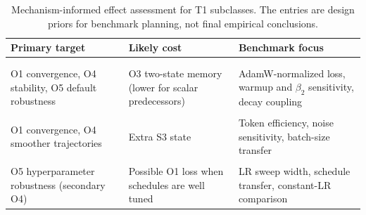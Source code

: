 \begin{table}[!htbp]
  \centering
  \caption{Mechanism-informed effect assessment for T1 subclasses. The entries are design priors for benchmark planning, not final empirical conclusions.}
  \label{tab:t1_effect_assessment}
  \scriptsize
  \setlength{\tabcolsep}{3pt}
  \renewcommand{\arraystretch}{1.08}
  \begin{tabularx}{\linewidth}{@{}Y Y Y@{}}
    \toprule
    Primary target & Likely cost & Benchmark focus \\
    \midrule
     \\
     \\
      O1 convergence, O4 stability, O5 default robustness
      & O3 two-state memory (lower for scalar predecessors)
      & AdamW-normalized loss, warmup and $\beta_2$ sensitivity, decay coupling \\
     \\
      O1 convergence, O4 smoother trajectories
      & Extra S3 state
      & Token efficiency, noise sensitivity, batch-size transfer \\
     \\
      O5 hyperparameter robustness (secondary O4)
      & Possible O1 loss when schedules are well tuned
      & LR sweep width, schedule transfer, constant-LR comparison \\
    \bottomrule
  \end{tabularx}
\end{table}
